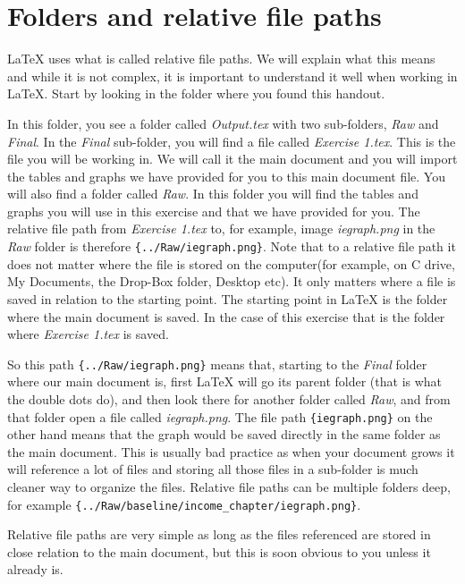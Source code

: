 \documentclass[12pts]{article}
\begin{document}
	\section{Folders and relative file paths}
	{\LaTeX} uses what is called relative file paths. We will explain what this means and while it is not complex, it is important to understand it well when working in {\LaTeX}. Start by looking in the folder where you found this handout. 
	
	In this folder, you see a folder called \emph{Output.tex} with two sub-folders, \emph{Raw} and \emph{Final}. In the \emph{Final} sub-folder, you will find a file called \emph{Exercise 1.tex}. This is the file you will be working in. We will call it the main document and you will import the tables and graphs we have provided for you to this main document file. You will also find a folder called \emph{Raw}. In this folder you will find the tables and graphs you will use in this exercise and that we have provided for you. The relative file path from \emph{Exercise 1.tex} to, for example, image \emph{iegraph.png} in the \emph{Raw} folder is therefore \verb|{../Raw/iegraph.png}|. Note that to a relative file path it does not matter where the file is stored on the computer(for example, on C drive, My Documents, the Drop-Box folder, Desktop etc). It only matters where a file is saved in relation to the starting point. The starting point in {\LaTeX} is the folder where the main document is saved. In the case of this exercise that is the folder where \emph{Exercise 1.tex} is saved.
	
	So this path \verb|{../Raw/iegraph.png}| means that, starting to the \emph{Final} folder where our main document is, first {\LaTeX} will go its parent folder (that is what the double dots do), and then look there for another folder called \emph{Raw}, and from that folder open a file called \emph{iegraph.png}. The file path \verb|{iegraph.png}| on the other hand means that the graph would be saved directly in the same folder as the main document. This is usually bad practice as when your document grows it will reference a lot of files and storing all those files in a sub-folder is much cleaner way to organize the files. Relative file paths can be multiple folders deep, for example \verb|{../Raw/baseline/income_chapter/iegraph.png}|. 
	
	Relative file paths are very simple as long as the files referenced are stored in close relation to the main document, but this is soon obvious to you unless it already is.
	
\end{document}
